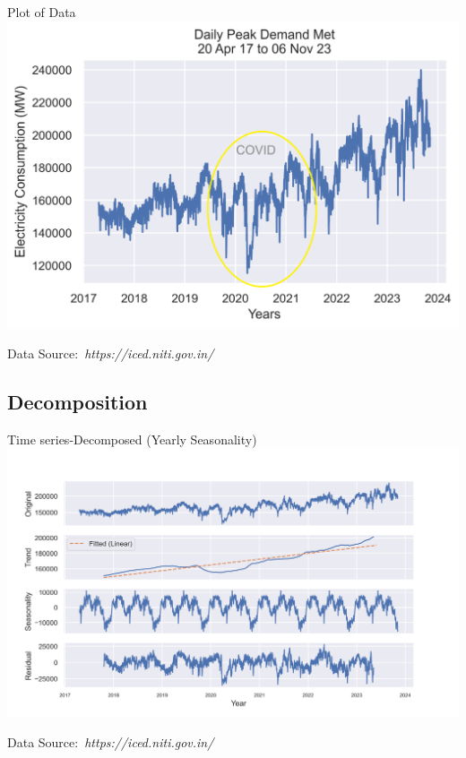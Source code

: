 \documentclass{beamer}
\newcommand{\credit}[1]{\par\hfill \footnotesize Data Source:~\itshape#1}
\begin{document}
\begin{frame}{Plot of Data}
\centering
\includegraphics[scale=.75]{images/Daily Peak1.png}
\credit{https://iced.niti.gov.in/}
\end{frame}
\subsection{Decomposition}
\begin{frame}{Time series-Decomposed (Yearly Seasonality) }
\centering
\includegraphics[scale=.50]{images/Decompose.png}
\credit{https://iced.niti.gov.in/}
\end{frame}
\end{document}
